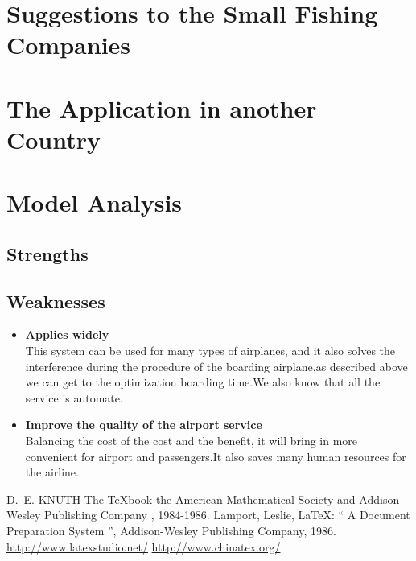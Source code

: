 \documentclass{mcmthesis}
\begin{document}
\section{Suggestions to the Small Fishing Companies}


\section{The Application in another Country}

\section{Model Analysis}
\subsection{Strengths}

\subsection{Weaknesses}


\begin{itemize}
\item \textbf{Applies widely}\\
This  system can be used for many types of airplanes, and it also
solves the interference during  the procedure of the boarding
airplane,as described above we can get to the  optimization
boarding time.We also know that all the service is automate.

\item \textbf{Improve the quality of the airport service}\\
Balancing the cost of the cost and the benefit, it will bring in
more convenient  for airport and passengers.It also saves many
human resources for the airline.
\end{itemize}

\begin{thebibliography}{99}
 D.~E. KNUTH   The \TeX{}book  the American
Mathematical Society and Addison-Wesley
Publishing Company , 1984-1986.
Lamport, Leslie,  \LaTeX{}: `` A Document Preparation System '',
Addison-Wesley Publishing Company, 1986.
\url{http://www.latexstudio.net/}
\url{http://www.chinatex.org/}
\end{thebibliography}
\end{document}
